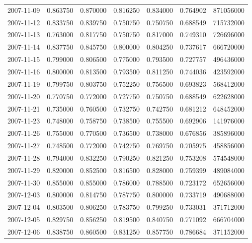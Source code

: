 \begin{tabular}{lrrrrrr}
2007-11-09 &    0.863750 &    0.870000 &    0.816250 &    0.834000 &    0.764902 &   871056000 \\
2007-11-12 &    0.833750 &    0.839750 &    0.750750 &    0.750750 &    0.688549 &   715732000 \\
2007-11-13 &    0.763000 &    0.817750 &    0.750750 &    0.817000 &    0.749310 &   726696000 \\
2007-11-14 &    0.837750 &    0.845750 &    0.800000 &    0.804250 &    0.737617 &   666720000 \\
2007-11-15 &    0.799000 &    0.806500 &    0.775000 &    0.793500 &    0.727757 &   496436000 \\
2007-11-16 &    0.800000 &    0.813500 &    0.793500 &    0.811250 &    0.744036 &   423592000 \\
2007-11-19 &    0.799750 &    0.803750 &    0.752250 &    0.756500 &    0.693823 &   568412000 \\
2007-11-20 &    0.770750 &    0.772000 &    0.727750 &    0.750750 &    0.688549 &   622628000 \\
2007-11-21 &    0.735000 &    0.760500 &    0.732750 &    0.742750 &    0.681212 &   648452000 \\
2007-11-23 &    0.748000 &    0.758750 &    0.738500 &    0.755500 &    0.692906 &   141976000 \\
2007-11-26 &    0.755000 &    0.770500 &    0.736500 &    0.738000 &    0.676856 &   385896000 \\
2007-11-27 &    0.748500 &    0.772000 &    0.742750 &    0.769750 &    0.705975 &   458856000 \\
2007-11-28 &    0.794000 &    0.832250 &    0.790250 &    0.821250 &    0.753208 &   574548000 \\
2007-11-29 &    0.820000 &    0.852500 &    0.816500 &    0.828000 &    0.759399 &   489084000 \\
2007-11-30 &    0.855000 &    0.855000 &    0.786000 &    0.788500 &    0.723172 &   652656000 \\
2007-12-03 &    0.800000 &    0.814750 &    0.787750 &    0.800000 &    0.733719 &   490688000 \\
2007-12-04 &    0.803500 &    0.806250 &    0.783750 &    0.799250 &    0.733031 &   371712000 \\
2007-12-05 &    0.829750 &    0.856250 &    0.819500 &    0.840750 &    0.771092 &   666704000 \\
2007-12-06 &    0.838750 &    0.860500 &    0.831250 &    0.857750 &    0.786684 &   371152000 \\

\end{tabular}
